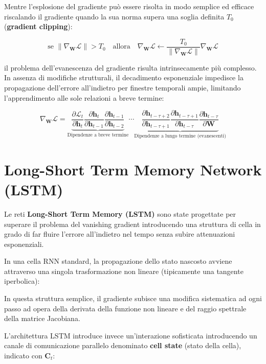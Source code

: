 ﻿\documentclass[11pt, a4paper]{article}
\begin{document}
Mentre l'esplosione del gradiente può essere risolta in modo semplice ed efficace riscalando il gradiente quando la sua norma supera una soglia definita $T_0$ (\textbf{gradient clipping}):

\[
\boxed{\text{se } \|\nabla_{\bm{W}}\mathcal{L}\| > T_0 \quad \text{allora} \quad \nabla_{\bm{W}}\mathcal{L} \leftarrow \frac{T_0}{\|\nabla_{\bm{W}}\mathcal{L}\|} \nabla_{\bm{W}}\mathcal{L}}
\]

il problema dell'evanescenza del gradiente risulta intrinsecamente più complesso. In assenza di modifiche strutturali, il decadimento esponenziale impedisce la propagazione dell'errore all'indietro per finestre temporali ampie, limitando l'apprendimento alle sole relazioni a breve termine:

\[
\nabla_{\bm{W}}\mathcal{L} = \underbrace{\frac{\partial \mathcal{L}_t}{\partial \bm{h}_t} \frac{\partial \bm{h}_t}{\partial \bm{h}_{t-1}} \frac{\partial \bm{h}_{t-1}}{\partial \bm{h}_{t-2}}}_{\text{Dipendenze a breve termine}} \cdots \underbrace{\frac{\partial \bm{h}_{t-\tau+2}}{\partial \bm{h}_{t-\tau+1}} \frac{\partial \bm{h}_{t-\tau+1}}{\partial \bm{h}_{t-\tau}} \frac{\partial \bm{h}_{t-\tau}}{\partial \bm{W}}}_{\text{Dipendenze a lungo termine (evanescenti)}}
\]

\newpage

\section{Long-Short Term Memory Network (LSTM)}

Le reti \textbf{Long-Short Term Memory (LSTM)} sono state progettate per superare il problema del vanishing gradient introducendo una struttura di cella in grado di far fluire l'errore all'indietro nel tempo senza subire attenuazioni esponenziali.

In una cella RNN standard, la propagazione dello stato nascosto avviene attraverso una singola trasformazione non lineare (tipicamente una tangente iperbolica):


In questa struttura semplice, il gradiente subisce una modifica sistematica ad ogni passo ad opera della derivata della funzione non lineare e del raggio spettrale della matrice Jacobiana.

L'architettura LSTM introduce invece un'interazione sofisticata introducendo un canale di comunicazione parallelo denominato \textbf{cell state} (stato della cella), indicato con $\bm{C}_t$:
\end{document}
